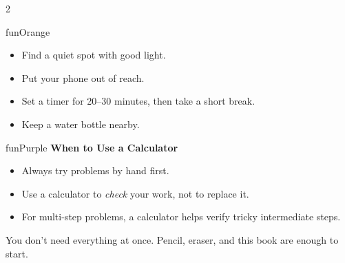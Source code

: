 {\begin{multicols}{2}
\begin{wbDashBox}{funOrange}
    \begin{itemize}[leftmargin=*, itemsep=3pt]
        \item Find a quiet spot with good light.
        \item Put your phone out of reach.
        \item Set a timer for 20--30 minutes, then take a short break.
        \item Keep a water bottle nearby.
    \end{itemize}
\end{wbDashBox}

\vspace{5mm}

\begin{wbDashBox}{funPurple}
    {\bfseries\color{funPurpleDark}\faCalculator\hspace{2mm}When to Use a Calculator}

    \vspace{3mm}

    \begin{itemize}[leftmargin=*, itemsep=3pt]
        \item Always try problems by hand first.
        \item Use a calculator to \emph{check} your work, not to replace it.
        \item For multi-step problems, a calculator helps verify tricky
              intermediate steps.
    \end{itemize}
\end{wbDashBox}

\vspace{5mm}

\begin{center}
    \color{funGray}\normalsize
    \faInfoCircle\hspace{2mm}You don't need everything at once.
    Pencil, eraser, and this book are enough to start.
\end{center}

\end{multicols}

}%

\clearpage
